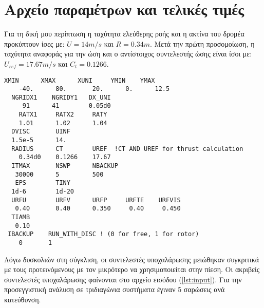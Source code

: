 \section{Αρχείο παραμέτρων και τελικές τιμές}

Για τη δική μου περίπτωση η ταχύτητα ελεύθερης ροής και η ακτίνα του δρομέα προκύπτουν ίσες με: $U=14m/s$ και $R=0.34m$. Μετά την πρώτη προσομοίωση, η ταχύτητα αναφοράς για την ώση και ο αντίστοιχος συντελεστής ώσης είναι ίσοι με: $U_{ref}=17.67m/s$ και $C_t=0.1266$.

\begin{lstlisting}[caption=\textrm{Αρχείο εισόδου}, label={lst:input}, mathescape=true, breaklines=true, linewidth=.65\textwidth]
    XMIN      XMAX      XUNI     YMIN    YMAX
    -40.      80.       20.      0.      12.5   
  NGRIDX1    NGRIDY1   DX_UNI
     91      41        0.05d0
    RATX1     RATX2     RATY      
    1.01      1.02      1.04
  DVISC       UINF      
  1.5e-5      14.        
  RADIUS      CT        UREF  !CT AND UREF for thrust calculation
    0.34d0    0.1266    17.67        
  ITMAX       NSWP      NBACKUP            
   30000      5         500 
   EPS        TINY
  1d-6        1d-20
  URFU        URFV      URFP     URFTE    URFVIS
   0.40       0.40      0.350     0.40     0.450
  TIAMB                                    
   0.10                                   
 IBACKUP    RUN_WITH_DISC ! (0 for free, 1 for rotor)
    0       1
\end{lstlisting}

Λόγω δυσκολιών στη σύγκλιση, οι συντελεστές υποχαλάρωσης μειώθηκαν συγκριτικά με τους προτεινόμενους με τον μικρότερο να χρησιμοποιείται στην πίεση. Οι ακριβείς συντελεστές υποχαλάρωσης φαίνονται στο αρχείο εισόδου (\ref{lst:input}). Για την προσεγγιστική ανάλυση σε τριδιαγώνια συστήματα έγιναν 5 σαρώσεις ανά κατεύθυνση.
